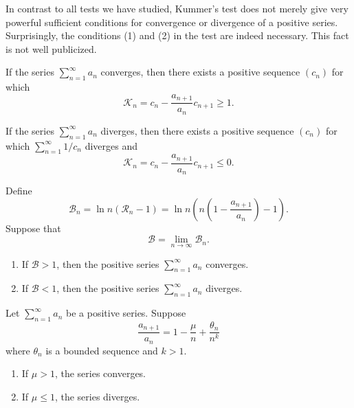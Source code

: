 \begin{remark}
  In contrast to all tests we have studied, Kummer's test does not
  merely give very powerful sufficient conditions for convergence or
  divergence of a positive series. Surprisingly, the conditions (1)
  and (2) in the test are indeed necessary. This fact is not well publicized.
\end{remark}

\begin{theorem}
  If the series $\sum_{n = 1}^{\infty} a_n$ converges, then there
  exists a positive sequence $(c_n)$ for which
  \[ \mathcal{K}_n = c_n - \frac{a_{n + 1}}{a_n} c_{n + 1} \geq 1. \]
\end{theorem}

\begin{theorem}
  If the series $\sum_{n = 1}^{\infty} a_n$ diverges, then there
  exists a positive sequence $(c_n)$ for which
  $\sum_{n = 1}^{\infty} 1/c_n$ diverges and
  \[ \mathcal{K}_n = c_n - \frac{a_{n + 1}}{a_n} c_{n + 1} \leq 0. \]
\end{theorem}

\begin{proposition}
  Define
  \[ \mathcal{B}_n = \ln n (\mathcal{R}_n - 1) = \ln n \left(n
      \left(1 - \frac{a_{n +
  1}}{a_n}\right) - 1\right). \]
  Suppose that
  \[ \mathcal{B} = \lim_{n \to \infty} \mathcal{B}_n. \]
  \begin{enumerate}
    \item If $\mathcal{B} > 1$, then the positive series $\sum_{n = 1}^{\infty}
      a_n$ converges.
    \item If $\mathcal{B} < 1$, then the positive series $\sum_{n = 1}^{\infty}
      a_n$ diverges.
  \end{enumerate}
\end{proposition}

\begin{proposition}
  Let $\sum_{n = 1}^{\infty} a_n$ be a positive series. Suppose
  \[ \frac{a_{n + 1}}{a_n} = 1 - \frac{\mu}{n} + \frac{\theta_n}{n^k} \]
  where $\theta_n$ is a bounded sequence and $k > 1$.
  \begin{enumerate}
    \item If $\mu > 1$, the series converges.
    \item If $\mu \leq 1$, the series diverges.
  \end{enumerate}
\end{proposition}


